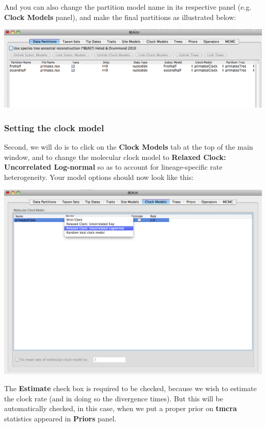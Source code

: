 \documentclass[12pt]{article}
\begin{document}
\medskip{}

And you can also change the partition model name in its respective panel (e.g. {\bf Clock Models}  panel), and make the final partitions as illustrated below:

\medskip{}

\includegraphics[scale=0.4]{figures/BEAUti_DataPartitions_final}

\medskip{}

\subsubsection*{Setting the clock model}

Second, we will do is to click on the {\bf Clock Models} tab at the top of the
main window, and to change the molecular clock model to \textbf{Relaxed Clock: Uncorrelated
Log-normal} so as to account for lineage-specific rate heterogeneity.
Your model options should now look like this: 

\medskip{}

\includegraphics[scale=0.4]{figures/BEAUti_Clock}

\medskip{}

The \textbf{Estimate} check box is required to be checked, because we wish to estimate
the clock rate (and in doing so the divergence times). But this will be automatically checked, in this case, when we put a proper prior on \textbf{tmcra} statistics appeared in \textbf{Priors} panel.
\end{document}
